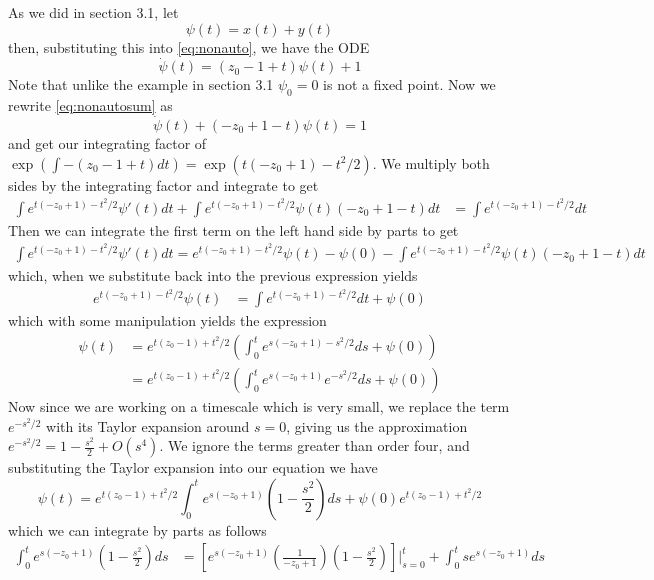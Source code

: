 \documentclass[11pt]{article}
\begin{document}
As we did in section 3.1, let $$\psi(t) = x(t) + y(t)$$then, substituting this into \eqref{eq:nonauto}, we have the ODE 
\begin{equation*}\label{eq:nonautosum}
    \dot{\psi}(t) = (z_0 - 1 +t)\psi(t) + 1 
\end{equation*}
Note that unlike the example in section 3.1 $\psi_0 = 0$ is not a fixed point. Now we rewrite \eqref{eq:nonautosum} as $$\dot{\psi}(t) + (-z_0 + 1 -t)\psi(t) = 1 $$and get our integrating factor of $\exp(\int- (z_0 - 1 +t) dt ) = \exp(t(-z_0 + 1) - t^2/2)$. We multiply both sides by the integrating factor and integrate to get
\begin{align*}
    \int e^{t(-z_0 + 1) - t^2/2}\psi'(t)dt  +\int e^{t(-z_0 + 1) - t^2/2}\psi(t)(-z_0 + 1 - t)dt &= \int e^{t(-z_0 + 1) - t^2/2}dt
\end{align*}
Then we can integrate the first term on the left hand side by parts to get 
\begin{align*}
    \int e^{t(-z_0 + 1) - t^2/2}\psi'(t)dt = e^{t(-z_0 + 1) - t^2/2}\psi(t) - \psi(0) - \int e^{t(-z_0 + 1) - t^2/2}\psi(t)(-z_0 + 1 - t)dt
\end{align*}
which, when we substitute back into the previous expression yields 
\begin{align*}
    e^{t(-z_0 + 1) - t^2/2}\psi(t)  &= \int e^{t(-z_0 + 1) - t^2/2}dt + \psi(0) 
\end{align*}
which with some manipulation yields the expression
\begin{align*}
    \psi(t) &=e^{t(z_0 - 1) + t^2/2} \left(\int_0^{t} e^{s(-z_0 + 1) - s^2/2}ds + \psi(0)\right)\\
    &= e^{t(z_0 - 1) + t^2/2}\left( \int_0^t e^{s(-z_0 + 1)} e^{- s^2/2}ds + \psi(0)\right)
\end{align*}
Now since we are working on a timescale which is very small, we replace the term $e^{- s^2/2}$ with its Taylor expansion around $s = 0$, giving us the approximation $e^{- s^2/2} = 1 - \frac{s^2}{2} + O(s^4)$. We ignore the terms greater than order four, and substituting the Taylor expansion into our equation we have $$\psi(t) = e^{t(z_0 - 1) + t^2/2} \int_0^t e^{s(-z_0 + 1)}\left(1 - \frac{s^2}{2}\right)ds + \psi(0)e^{t(z_0 - 1) + t^2/2}$$which we can integrate by parts as follows
\begin{align*}
    \int_0^t e^{s(-z_0 + 1)}\left(1 - \frac{s^2}{2}\right)ds &= \left[ e^{s(-z_0 + 1)}\left( \frac{1}{-z_0 + 1}\right) \left( 1 - \frac{s^2}{2} \right)\right]\bigg\rvert_{s = 0}^t   + \int_0^t se^{s(-z_0 + 1)}ds
\end{align*}
\end{document}
